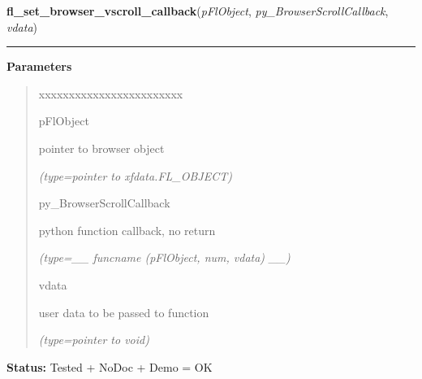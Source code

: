 \hspace{.8\funcindent}\begin{boxedminipage}{\funcwidth}

    \raggedright \textbf{fl\_set\_browser\_vscroll\_callback}(\textit{pFlObject}, \textit{py\_BrowserScrollCallback}, \textit{vdata})

    \vspace{-1.5ex}

    \rule{\textwidth}{0.5\fboxrule}
\setlength{\parskip}{2ex}
\setlength{\parskip}{1ex}
      \textbf{Parameters}
      \vspace{-1ex}

      \begin{quote}
        \begin{Ventry}{xxxxxxxxxxxxxxxxxxxxxxxx}

          \item[pFlObject]

          pointer to browser object

            {\it (type=pointer to xfdata.FL\_OBJECT)}

          \item[py\_BrowserScrollCallback]

          python function callback, no return

            {\it (type=\_\_ funcname (pFlObject, num, vdata) \_\_)}

          \item[vdata]

          user data to be passed to function

            {\it (type=pointer to void)}

        \end{Ventry}

      \end{quote}

\textbf{Status:} Tested + NoDoc + Demo = OK



    \end{boxedminipage}

    \label{xformslib:flbrowser:fl_get_browser_line_yoffset}

    \vspace{0.5ex}

